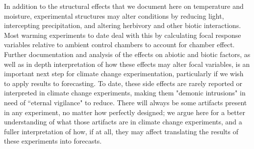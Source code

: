 \documentclass{article}
\begin{document}
\par In addition to the structural effects that we document here on temperature and moisture, experimental structures may alter conditions by reducing light, intercepting precipitation, and altering herbivory and other biotic interactions\citep{kennedy1995,wolkovich2012}. Most warming experiments to date deal with this by calculating focal response variables relative to ambient control chambers to account for chamber effect\citep [e.g.][]{marchin2015}. Further documentation and analysis of the effects on abiotic and biotic factors, as well as in depth interpretation of how these effects may alter focal variables, is an important next step for climate change experimentation, particularly if we wish to apply results to forecasting. To date, these side effects are rarely reported or interpreted in climate change experiments, making them "demonic intrusions" in need of “eternal vigilance" to reduce\citep{hurlbert1984}. There will always be some artifacts present in any experiment, no matter how perfectly designed; we argue here for a better understanding of what those artifacts are in climate change experiments, and a fuller interpretation of how, if at all, they may affect translating the results of these experiments into forecasts. 
\end{document}
